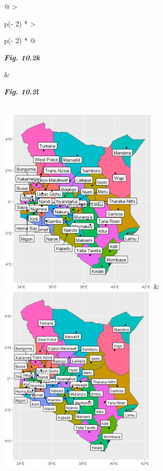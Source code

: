 \documentclass[
  letterpaper,
  DIV=11,
  numbers=noendperiod]{scrreprt}
\begin{document}
\begin{longtable}[]{@{}
  >{\raggedright\arraybackslash}p{(\columnwidth - 2\tabcolsep) * }
  >{\raggedright\arraybackslash}p{(\columnwidth - 2\tabcolsep) * }@{}}
\toprule\noalign{}
\begin{minipage}[b]{\linewidth}\raggedright
\textbf{\emph{Fig. 10.2k}}
\end{minipage} & \begin{minipage}[b]{\linewidth}\raggedright
\textbf{\emph{Fig. 10.2l}}
\end{minipage} \\
\midrule\noalign{}
\endhead
\bottomrule\noalign{}
\endlastfoot
\includegraphics[width=3.02823in,height=3.60801in]{figures/Fig10.2k.png}
&
\includegraphics[width=2.97918in,height=3.60418in]{figures/Fig10.2l.png} \\
\end{longtable}
\end{document}
